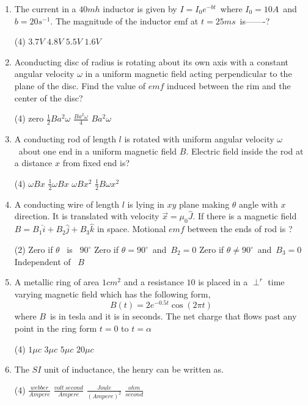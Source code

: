 \begin{enumerate}[ label=\color{ocre}\textbf{\arabic*.}]
\begin{tasks}
	\end{tasks}
	\item The current in a $40mh$ inductor is given by $I=I_0 e^{-bt}$\ where $I_0=10A$\ and $b=20s^{-1}$. The magnitude of the inductor emf  at $t=25ms$\ is-------?
	\begin{tasks}(4)
		\task[\textbf{a.}]$3.7V$
		\task[\textbf{b.}]$4.8V$
		\task[\textbf{c.}]$5.5V$
		\task[\textbf{d.}]$1.6V$
	\end{tasks}
	\item Aconducting disc of radius is rotating about its own axis with a constant angular velocity $\omega$ in a uniform magnetic field acting perpendicular to the plane of the disc. Find the value of $emf$ induced between the rim and the center of the disc?
	\begin{tasks}(4)
		\task[\textbf{a.}]zero
		\task[\textbf{b.}]$\frac{1}{2}Ba^2\omega$
		\task[\textbf{c.}]$\frac{Ba^2\omega}{4}$
		\task[\textbf{d.}]$Ba^2\omega$
	\end{tasks}
	\item A conducting rod of length $l$ is rotated with uniform angular velocity $\omega$\ about one end in  a uniform magnetic field $B$. Electric field inside the rod at a distance $x$ from fixed end is?
	\begin{tasks}(4)
		\task[\textbf{a.}]$\omega Bx$
		\task[\textbf{b.}]$\frac{1}{2}\omega Bx$
		\task[\textbf{c.}]$\omega Bx^2$
		\task[\textbf{d.}]$\frac{1}{2}B\omega x^2$
	\end{tasks}
	\item A conducting wire of length $l$ is lying in $xy$ plane making $\theta$ angle with $x$ direction. It is translated with velocity $\vec{x}=\mu_0\hat{J}$. If there is a magnetic field $B=B_1 \hat{i}+B_2\hat{j}+B_3 \hat{k}$ in space. Motional $emf$ between the ends of rod is ?
	\begin{tasks}(2)
		\task[\textbf{a.}]Zero if $\theta$  \ is \ $90^\circ$
		\task[\textbf{b.}]Zero if $\theta=90^\circ$\ and\ $B_2=0$
		\task[\textbf{c.}]Zero if $\theta\neq90^\circ$\ and\ $B_3=0$
		\task[\textbf{d.}]Independent of \ $B$
	\end{tasks}
	\item A metallic ring of area $1cm^2$ and a resistance $10$ is placed in a $\perp^r$ time varying magnetic field which has the following form,
	$$B(t)=2e^{-0.5t}\cos(2\pi t)$$where $B$\ is in tesla and it is in seconds. The net charge that flows past any point in the ring form $t=0$ to $t=\alpha$ 
	\begin{tasks}(4)
		\task[\textbf{a.}]$1\mu c$
		\task[\textbf{b.}]$3\mu c$
		\task[\textbf{c.}]$5\mu c$
		\task[\textbf{d.}]$20\mu c$
	\end{tasks}
	\item The $SI$ unit of inductance, the henry can be written as.
	\begin{tasks}(4)
		\task[\textbf{a.}]$\frac{webber}{Ampere}$
		\task[\textbf{b.}]$\frac{volt \ second }{Ampere}$
		\task[\textbf{c.}]$\frac{Joule}{(Ampere)^2}$
		\task[\textbf{d.}]$\frac{ohm}{second}$
	\end{tasks}
\end{enumerate}
